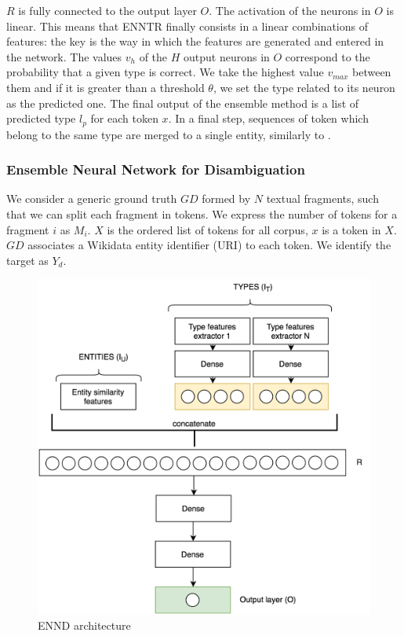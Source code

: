 \documentclass{llncs}
\begin{document}
$R$ is fully connected to the output layer $O$. The activation of the neurons in $O$ is linear. This means that ENNTR finally consists in a linear combinations of features: the key is the way in which the features are generated and entered in the network. The values $v_h$ of the $H$ output neurons in $O$ correspond to the probability that a given type is correct. We take the highest value $v_{max}$ between them and if it is greater than a threshold $\theta$, we set the type related to its neuron as the predicted one. The final output of the ensemble method is a list of predicted type $l_{p}$ for each token $x$. In a final step, sequences of token which belong to the same type are merged to a single entity, similarly to \cite{fox1,fox2}.

\subsubsection{Ensemble Neural Network for Disambiguation}
We consider a generic ground truth $GD$ formed by $N$ textual fragments, such that we can split each fragment in tokens. We express the number of tokens for a fragment $i$ as $M_i$. $X$ is the ordered list of tokens for all corpus, $x$ is a token in $X$. $GD$ associates a Wikidata entity identifier (URI) to each token. We identify the target as $Y_d$.

\begin{figure}[!ht]
	\centering
    	\includegraphics[scale=0.25]{NN_disambiguation.png}
 	\caption{ENND architecture}
 	\label{fig:NN_disambiguation}
\end{figure}
\end{document}
